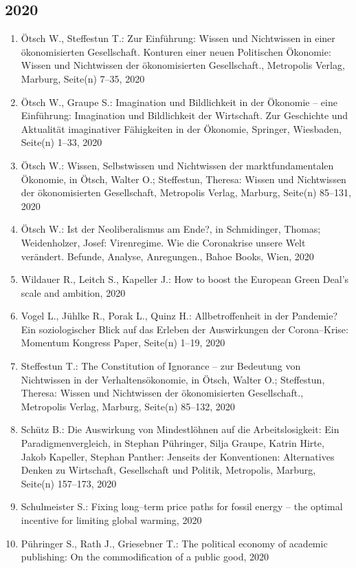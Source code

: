 \subsection*{2020}
\begin{enumerate}
    	 \item Ötsch W., Steffestun T.: Zur Einführung: Wissen und Nichtwissen in einer ökonomisierten Gesellschaft. Konturen einer neuen Politischen Ökonomie: Wissen und Nichtwissen der ökonomisierten Gesellschaft., Metropolis Verlag, Marburg, Seite(n) 7–35, 2020
	 \item Ötsch W., Graupe S.: Imagination und Bildlichkeit in der Ökonomie – eine Einführung: Imagination und Bildlichkeit der Wirtschaft. Zur Geschichte und Aktualität imaginativer Fähigkeiten in der Ökonomie, Springer, Wiesbaden, Seite(n) 1--33, 2020
	 \item Ötsch W.: Wissen, Selbstwissen und Nichtwissen der marktfundamentalen Ökonomie, in Ötsch, Walter O.; Steffestun, Theresa: Wissen und Nichtwissen der ökonomisierten Gesellschaft, Metropolis Verlag, Marburg, Seite(n) 85--131, 2020
	 \item Ötsch W.: Ist der Neoliberalismus am Ende?, in Schmidinger, Thomas; Weidenholzer, Josef: Virenregime. Wie die Coronakrise unsere Welt verändert. Befunde, Analyse, Anregungen., Bahoe Books, Wien, 2020
	 \item Wildauer R., Leitch S., Kapeller J.: How to boost the European Green Deal’s scale and ambition, 2020
	 \item Vogel L., Jühlke R., Porak L., Quinz H.: Allbetroffenheit in der Pandemie? Ein soziologischer Blick auf das Erleben der Auswirkungen der Corona--Krise: Momentum Kongress Paper, Seite(n) 1--19, 2020
	 \item Steffestun T.: The Constitution of Ignorance -- zur Bedeutung von Nichtwissen in der Verhaltensökonomie, in Ötsch, Walter O.; Steffestun, Theresa: Wissen und Nichtwissen der ökonomisierten Gesellschaft., Metropolis Verlag, Marburg, Seite(n) 85--132, 2020
	 \item Schütz B.: Die Auswirkung von Mindestlöhnen auf die Arbeitslosigkeit: Ein Paradigmenvergleich, in Stephan Pühringer, Silja Graupe, Katrin Hirte, Jakob Kapeller, Stephan Panther: Jenseits der Konventionen: Alternatives Denken zu Wirtschaft, Gesellschaft und Politik, Metropolis, Marburg, Seite(n) 157--173, 2020
	 \item Schulmeister S.: Fixing long--term price paths for fossil energy – the optimal incentive for limiting global warming, 2020
	 \item Pühringer S., Rath J., Griesebner T.: The political economy of academic publishing: On the commodification of a public good, 2020

\end{enumerate}
